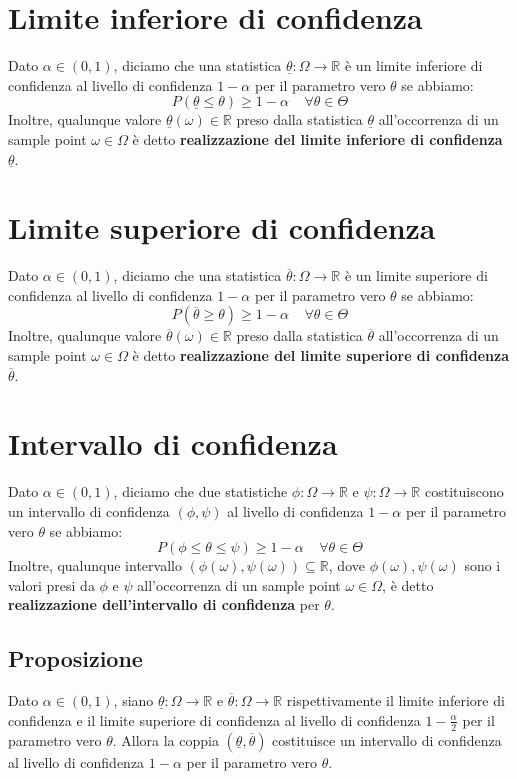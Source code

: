 \documentclass{article}
\begin{document}
\section*{Limite inferiore di confidenza}
Dato $\alpha \in (0,1)$, diciamo che una statistica $\underline{\theta}: \Omega \to \mathbb{R}$ è un limite inferiore di confidenza al livello di confidenza $1-\alpha$ per il parametro vero $\theta$ se abbiamo:
\[ P(\underline{\theta} \leq \theta) \geq 1-\alpha \; \; \; \; \forall \theta \in \Theta \]
Inoltre, qualunque valore $\underline{\theta}(\omega) \in \mathbb{R}$ preso dalla statistica $\underline{\theta}$ all'occorrenza di un sample point $\omega \in \Omega$ è detto \textbf{realizzazione del limite inferiore di confidenza} $\underline{\theta}$.

\section*{Limite superiore di confidenza}
Dato $\alpha \in (0,1)$, diciamo che una statistica $\overline{\theta}: \Omega \to \mathbb{R}$ è un limite superiore di confidenza al livello di confidenza $1-\alpha$ per il parametro vero $\theta$ se abbiamo:
\[ P(\overline{\theta} \geq \theta) \geq 1-\alpha \; \; \; \; \forall \theta \in \Theta \]
Inoltre, qualunque valore $\overline{\theta}(\omega) \in \mathbb{R}$ preso dalla statistica $\overline{\theta}$ all'occorrenza di un sample point $\omega \in \Omega$ è detto \textbf{realizzazione del limite superiore di confidenza} $\overline{\theta}$.

\section*{Intervallo di confidenza}
Dato $\alpha \in (0,1)$, diciamo che due statistiche $\phi: \Omega \to \mathbb{R}$ e $\psi: \Omega \to \mathbb{R}$ costituiscono un intervallo di confidenza $(\phi, \psi)$ al livello di confidenza $1-\alpha$ per il parametro vero $\theta$ se abbiamo:
\[ P(\phi \leq \theta \leq \psi) \geq 1-\alpha \; \; \; \; \forall \theta \in \Theta \]
Inoltre, qualunque intervallo $(\phi(\omega), \psi(\omega)) \subseteq \mathbb{R}$, dove $\phi(\omega), \psi(\omega)$ sono i valori presi da $\phi$ e $\psi$ all'occorrenza di un sample point $\omega \in \Omega$, è detto \textbf{realizzazione dell'intervallo di confidenza} per $\theta$.

\subsection*{Proposizione}
Dato $\alpha \in (0,1)$, siano $\underline{\theta}: \Omega \to \mathbb{R}$ e $\overline{\theta}: \Omega \to \mathbb{R}$ rispettivamente il limite inferiore di confidenza e il limite superiore di confidenza al livello di confidenza $1-\frac{\alpha}{2}$ per il parametro vero $\theta$. Allora la coppia $(\underline{\theta}, \overline{\theta})$ costituisce un intervallo di confidenza al livello di confidenza $1-\alpha$ per il parametro vero $\theta$.
\end{document}

